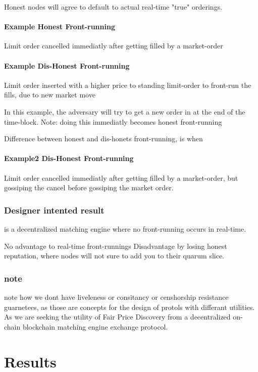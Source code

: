 \documentclass[12pt]{article}
\begin{document}
Honest nodes will agree to default to actual real-time "true" orderings. 

\paragraph*{Example Honest Front-running} 
Limit order cancelled immediatly after getting filled by a market-order 

\paragraph*{Example Dis-Honest Front-running} 
Limit order inserted with a higher price to standing limit-order to front-run the fills, due to new market move 

In this example, the adversary will try to get a new order in at the end of the time-block. 
Note: doing this immediatly becomes honest front-running 

Difference between honest and dis-honets front-running, is when 

\paragraph*{Example2 Dis-Honest Front-running} 
Limit order cancelled immediatly after getting filled by a market-order, but gossiping the cancel before gossiping the market order. 

\subsubsection{Designer intented result} is a decentralized matching engine where no front-running occurs in real-time. 

No advantage to real-time front-runnings 
Disadvantage by losing honest reputation, where nodes will not sure to add you to their quarum slice.  

\subsubsection{note}
note how we dont have liveleness or consitancy or censhorship resistance guarnetees, as those are concepts for the design of protols with differant utilities. As we are seeking the utility of Fair Price Discovery from a decentralized on-chain blockchain matching engine exchange protocol. 


\section{Results}
\cite{ChenA} 
\newpage
{}

% 
\end{document}
